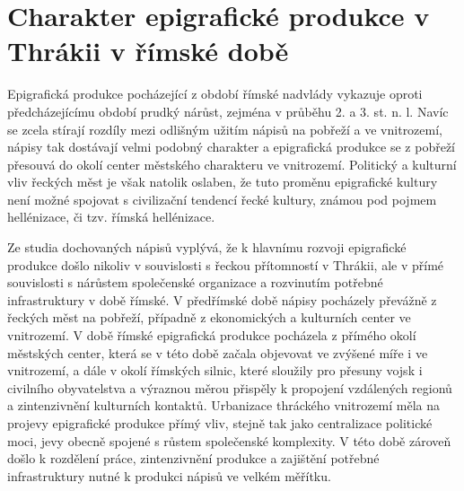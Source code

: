 
\section[charakter-epigrafické-produkce-v-thrákii-v-římské-době]{Charakter epigrafické produkce v Thrákii v římské době}

Epigrafická produkce pocházející z období římské nadvlády vykazuje oproti předcházejícímu období prudký nárůst, zejména v průběhu 2. a 3. st. n. l. Navíc se zcela stírají rozdíly mezi odlišným užitím nápisů na pobřeží a ve vnitrozemí, nápisy tak dostávají velmi podobný charakter a epigrafická produkce se z pobřeží přesouvá do okolí center městského charakteru ve vnitrozemí. Politický a kulturní vliv řeckých měst je však natolik oslaben, že tuto proměnu epigrafické kultury není možné spojovat s civilizační tendencí řecké kultury, známou pod pojmem hellénizace, či tzv. římská hellénizace.

Ze studia dochovaných nápisů vyplývá, že k hlavnímu rozvoji epigrafické produkce došlo nikoliv v souvislosti s řeckou přítomností v Thrákii, ale v přímé souvislosti s nárůstem společenské organizace a rozvinutím potřebné infrastruktury v době římské. V předřímské době nápisy pocházely převážně z řeckých měst na pobřeží, případně z ekonomických a kulturních center ve vnitrozemí. V době římské epigrafická produkce pocházela z přímého okolí městských center, která se v této době začala objevovat ve zvýšené míře i ve vnitrozemí, a dále v okolí římských silnic, které sloužily pro přesuny vojsk i civilního obyvatelstva a výraznou měrou přispěly k propojení vzdálených regionů a zintenzivnění kulturních kontaktů. Urbanizace thráckého vnitrozemí měla na projevy epigrafické produkce přímý vliv, stejně tak jako centralizace politické moci, jevy obecně spojené s růstem společenské komplexity. V této době zároveň došlo k rozdělení práce, zintenzivnění produkce a zajištění potřebné infrastruktury nutné k produkci nápisů ve velkém měřítku.

